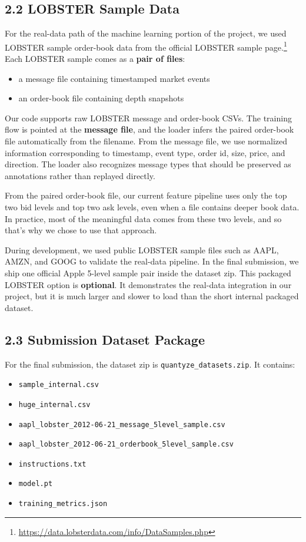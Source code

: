 \documentclass[11pt]{article}
\begin{document}
\subsection*{2.2 LOBSTER Sample Data}
For the real-data path of the machine learning portion of the project, we used
LOBSTER sample order-book data from the official LOBSTER sample page.\footnote{\url{https://data.lobsterdata.com/info/DataSamples.php}}
Each LOBSTER sample comes as a \textbf{pair of files}:
\begin{itemize}
    \item a message file containing timestamped market events
    \item an order-book file containing depth snapshots
\end{itemize}

Our code supports raw LOBSTER message and order-book CSVs. The training flow is
pointed at the \textbf{message file}, and the loader infers the paired
order-book file automatically from the filename. From the message file, we use
normalized information corresponding to timestamp, event type, order id, size,
price, and direction. The loader also recognizes message types that should be
preserved as annotations rather than replayed directly.

From the paired order-book file, our current feature pipeline uses only the top
two bid levels and top two ask levels, even when a file contains deeper book
data. In practice, most of the meaningful data comes from these two levels, and so that's why we chose to use that approach.

During development, we used public LOBSTER sample files such as AAPL, AMZN, and
GOOG to validate the real-data pipeline. In the final submission, we ship one
official Apple 5-level sample pair inside the dataset zip.
This packaged LOBSTER option is \textbf{optional}. It demonstrates the
real-data integration in our project, but it is much larger and slower to load than the short
internal packaged dataset.

\subsection*{2.3 Submission Dataset Package}
For the final submission, the dataset zip is \texttt{quantyze\_datasets.zip}. It
contains:
\begin{itemize}
    \item \texttt{sample\_internal.csv}
    \item \texttt{huge\_internal.csv}
    \item \texttt{aapl\_lobster\_2012-06-21\_message\_5level\_sample.csv}
    \item \texttt{aapl\_lobster\_2012-06-21\_orderbook\_5level\_sample.csv}
    \item \texttt{instructions.txt}
    \item \texttt{model.pt}
    \item \texttt{training\_metrics.json}
\end{itemize}
\end{document}

